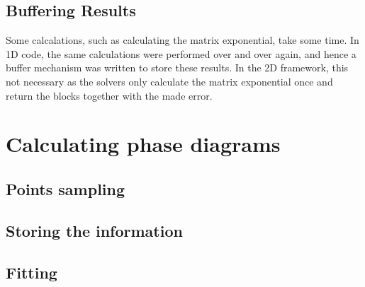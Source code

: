 
\subsection{Buffering Results}

Some calcalations, such as calculating the matrix exponential, take some time. In 1D code, the same calculations were performed over and over again, and hence a buffer mechanism was written to store these results. In the 2D framework, this not necessary as the solvers only calculate the matrix exponential once and return the blocks together with the made error.

\section{Calculating phase diagrams} \label{sec:phase_diag}

\subsection{Points sampling}

\subsection{Storing the information}

\subsection{Fitting}\label{subsec:qphasediag}


